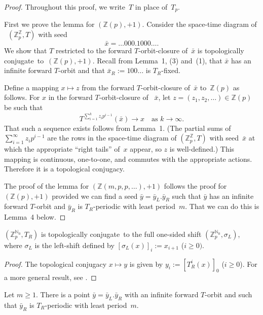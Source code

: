 \documentclass[12pt]{amsart}
\begin{document}
\begin{proof}
Throughout this proof, we write~$T$ in place of~$T_p$.

First we prove the lemma for 
$({\mathbb Z}(p),+1)$.
Consider the space-time diagram of
~$({\mathbb Z}_p^{\mathbb Z},T)$ with seed
$$\bar x = \dots 000.1000 \dots.$$
We show that $T$ restricted to the forward $T$-orbit-closure of~$\bar x$ is {topologically conjugate}\ to~$({\mathbb Z}(p),+1)$. Recall from Lemma~1, (3) and~(1), that $\bar x$ has an infinite forward $T$-orbit and that 
$\bar x_R := 100\dots$ is $T_R$-fixed.

Define a mapping $x \mapsto z$  from the forward $T$-orbit-closure of~$\bar x$ to~${\mathbb Z}(p)$ as follows.
For $x$ in the forward $T$-orbit-closure of
~$\bar x$,  let
$z = (z_1,z_2,\dots) \in {\mathbb Z}(p)$
be such that
$$ 
T^{\sum_{i=1}^k z_i p^{i-1}} (\bar x)
\rightarrow x \quad \text{as } 
k \rightarrow \infty.
$$
\noindent That such a sequence exists follows from Lemma~1. 
(The partial sums of
$\sum_{i=1}^\infty z_i p^{i-1}$
are the rows in the space-time diagram of $({\mathbb Z}_p^{\mathbb Z},T)$
with seed~$\bar x$ at which the
appropriate ``right tails'' of~$x$
appear, so $z$ is well-defined.)
This mapping is continuous, one-to-one, and commutes with the appropriate actions.  Therefore it is a topological conjugacy. 

The proof of the lemma for 
$({\mathbb Z}(m,p,p,\dots),+1)$ 
follows the proof for $({\mathbb Z}(p),+1)$
provided we can find a seed
$\bar y = \bar y_L.\bar y_R$ such that
$\bar y$ has an infinite forward $T$-orbit and
$\bar y_R$ is $T_R$-periodic with least period~$m$.
That we can do this is Lemma~4 below.
\end{proof}

\begin{lemma}
$({\mathbb Z}_p^{{\mathbb N}_0},T_R)$
is {topologically conjugate}\ to the full one-sided shift  
$({\mathbb Z}_p^{{\mathbb N}_0},\sigma_L)$,
where  $\sigma_L$ is the left-shift defined by
$[\sigma_L(x)]_i := x_{i+1}$ 
($i\ge 0)$.
\end{lemma}

\begin{proof}
The topological conjugacy $x \mapsto y$
is given by
$y_i := [T_R^i(x)]_0$  ($i\ge0$).
For a more general result, see \cite{BM}.
\end{proof}

\begin{lemma}
Let $m \ge 1$.
There is a point
$\bar y = \bar y_L.\bar y_R$
with an infinite forward $T$-orbit
and such that $\bar y_R$ 
is $T_R$-periodic with
least period~$m$.
\end{lemma}
\end{document}
